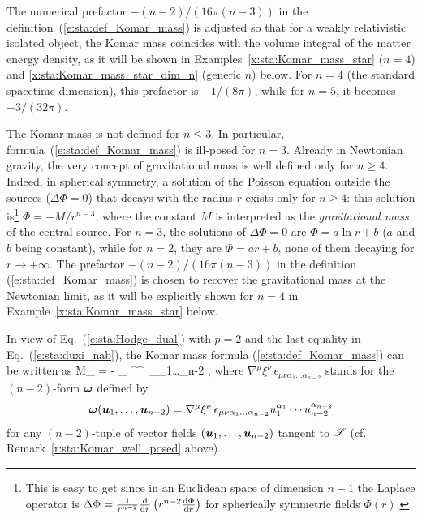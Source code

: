 \begin{remark}
The numerical prefactor $- (n-2)/(16\pi(n-3))$ in the definition~(\ref{e:sta:def_Komar_mass})
is adjusted so that for a weakly relativistic isolated object, the Komar mass coincides
with the volume integral of the matter energy density, as it will be shown in
Examples~\ref{x:sta:Komar_mass_star} ($n=4$)
and \ref{x:sta:Komar_mass_star_dim_n} (generic $n$) below.
For $n=4$ (the standard spacetime dimension), this prefactor is $-1/(8\pi)$,
while for $n=5$, it becomes $-3/(32\pi)$.
\end{remark}

\begin{remark}
The Komar mass is not defined for $n \leq 3$. In particular,
formula~(\ref{e:sta:def_Komar_mass}) is ill-posed for $n=3$.
Already in Newtonian gravity, the very concept of gravitational mass is well defined only
for $n \geq 4$. Indeed, in spherical symmetry,
a solution of the Poisson equation outside the sources ($\Delta \Phi = 0$)
that decays with the radius $r$ exists only for $n \geq 4$: this solution is\footnote{This is easy
to get since in an Euclidean space of dimension $n-1$ the Laplace
operator is $\Delta\Phi = \frac{1}{r^{n-2}} \frac{\mathrm{d} }{\mathrm{d} r} \left( r^{n-2} \frac{\mathrm{d} \Phi}{\mathrm{d} r} \right)$
for spherically symmetric fields $\Phi(r)$.}
$\Phi = -M/r^{n-3}$,
where the constant $M$ is interpreted as the \emph{gravitational mass} of the central source.
For $n=3$, the solutions of $\Delta \Phi = 0$ are $\Phi = a \ln r + b$ ($a$ and $b$ being constant), while
for $n=2$, they are $\Phi = a r + b$, none of them decaying for $r\to +\infty$.
The prefactor $-(n-2)/(16\pi(n-3))$ in the definition (\ref{e:sta:def_Komar_mass})
is chosen to recover the gravitational mass at the Newtonian limit, as
it will be explicitly shown for $n=4$ in Example~\ref{x:sta:Komar_mass_star} below.
\end{remark}

In view of Eq.~(\ref{e:sta:Hodge_dual}) with $p=2$ and the last equality in Eq.~(\ref{e:sta:duxi_nab}),
the Komar mass formula (\ref{e:sta:def_Komar_mass}) can be written as
\be \label{e:sta:def_Komar_mass_alt}
    M_{\Sp} = -   \int_{\Sp}  \nabla^\mu \xi^\nu \,
    \epsilon_{\mu\nu\alpha_1\ldots\alpha_{n-2}} ,
\ee
where $\nabla^\mu \xi^\nu \, \epsilon_{\mu\nu\alpha_1\ldots\alpha_{n-2}}$
stands for the $(n-2)$-form $\bm{\omega}$ defined by
\[
  \bm{\omega}(\bm{u}_1,\ldots,\bm{u}_{n-2}) = \nabla^\mu \xi^\nu \,
\epsilon_{\mu\nu\alpha_1\ldots\alpha_{n-2}} u_1^{\alpha_1} \cdots  u_{n-2}^{\alpha_{n-2}}
\]
for any $(n-2)$-tuple of vector fields $(\bm{u}_1,\ldots,\bm{u}_{n-2})$ tangent to $\mathscr{S}$ (cf. Remark~\ref{r:sta:Komar_well_posed} above).

